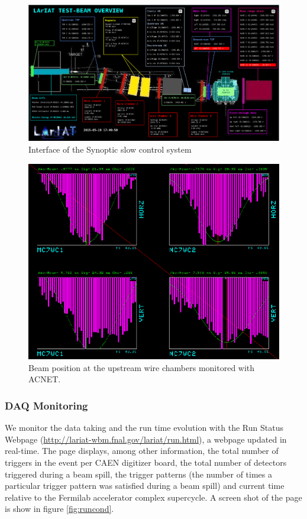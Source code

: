 \begin{figure}[htb]
\centering
\includegraphics[width=\textwidth,height=\textheight,keepaspectratio]{Chapter-3/Images/BeamOverview.png}
\caption{Interface of the Synoptic slow control system}
\label{fig:synoptics}
\end{figure}

\begin{figure}[htb]
\centering
\includegraphics[scale=0.5]{Chapter-3/Images/BeamPosition.png}
\caption{Beam position at the upstream wire chambers monitored with ACNET.}
\label{fig:ACNET}
\end{figure}

\subsubsection{DAQ Monitoring}

We monitor the data taking and the run time evolution with the Run Status Webpage (\href{http://lariat-wbm.fnal.gov/lariat/run.html}{http://lariat-wbm.fnal.gov/lariat/run.html}), a  webpage updated in real-time.  The page displays, among other information, the total number of triggers in the event per CAEN digitizer board, the total number of detectors triggered during a beam spill,  the trigger patterns (the number of times a particular trigger pattern was satisfied  during a beam spill) and current time relative to the Fermilab accelerator complex supercycle. A screen shot of the page is show in figure \ref{fig:runcond}.

